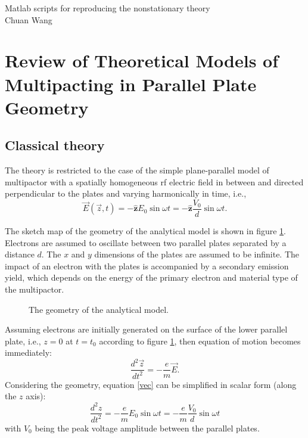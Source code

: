\documentclass[a4paper,11pt]{article}
\begin{document}
\begin{center}
{\large Matlab scripts for reproducing the nonstationary theory} \\
Chuan Wang \\
\end{center}
\section{Review of Theoretical Models of Multipacting in Parallel Plate Geometry} 
\subsection{Classical theory}
The theory is restricted to the case of the simple plane-parallel model of multipactor with a spatially homogeneous rf electric field in between and directed perpendicular to the plates and varying harmonically in time, i.e., 
\begin{equation}
\vec{E}(\vec{z},t) = -\mathbf{\hat{z}}E_0\sin \omega t=-\mathbf{\hat{z}}\frac{V_0}{d}\sin \omega t.
\end{equation} 

The sketch map of the geometry of the analytical model is shown in figure \ref{fig:sk}. Electrons are assumed to oscillate between two parallel plates separated by a distance $d$. The $x$ and $y$ dimensions of the plates are assumed to be infinite. The impact of an electron with the plates is accompanied by a secondary emission yield, which depends on the energy of the primary electron and material type of the multipactor. 
 
\begin{figure}[H]
\begin{center}

\end{center}
\caption{The geometry of the analytical model.\label{fig:sk}}
\end{figure}
Assuming electrons are initially generated on the surface of the lower parallel plate, i.e., $z=0$ at $t=t_0$ according to figure \ref{fig:sk}, then equation of motion becomes immediately: 
\begin{equation}
\frac{d^2\vec{z}}{dt^2} = -\frac{e}{m}\vec{E}.\label{vec}
\end{equation}
Considering the geometry, equation \eqref{vec} can be simplified in scalar form (along the $z$ axis):
\begin{equation}
\frac{d^2z}{dt^2} = -\frac{e}{m} E_0\sin\omega t= - \frac{e}{m}\frac{V_0}{d}\sin\omega t \label{scalar}
\end{equation}
with $V_0$ being  the peak voltage amplitude between the parallel plates.
\end{document}
